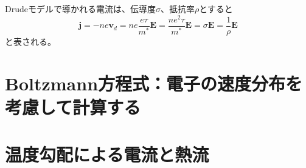 Drudeモデルで導かれる電流は、伝導度$\sigma$、抵抗率$\rho$とすると
\begin{equation}
	\bm{j} = -ne\bm{v}_d = ne\frac{e\tau}{m^*}\bm{E} = \frac{ne^2\tau}{m^*}\bm{E} = \sigma\bm{E} = \frac{1}{\rho}\bm{E}
\end{equation}
と表される。

\section{Boltzmann方程式：電子の速度分布を考慮して計算する}

\section{温度勾配による電流と熱流}

